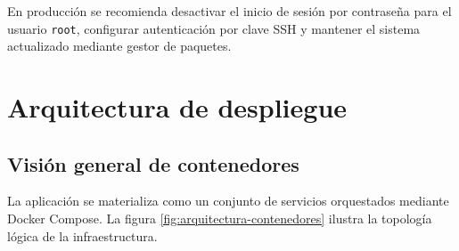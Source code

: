 \documentclass[11pt, a4paper]{article}
\begin{document}
En producci\'{o}n se recomienda desactivar el inicio de sesi\'{o}n por contrase\~{n}a para el usuario \texttt{root}, configurar autenticaci\'{o}n por clave SSH y mantener el sistema actualizado mediante gestor de paquetes.

\section{Arquitectura de despliegue}

\subsection{Visi\'{o}n general de contenedores}

La aplicaci\'{o}n se materializa como un conjunto de servicios orquestados mediante Docker Compose. La figura \ref{fig:arquitectura-contenedores} ilustra la topolog\'{i}a l\'{o}gica de la infraestructura.
\end{document}
